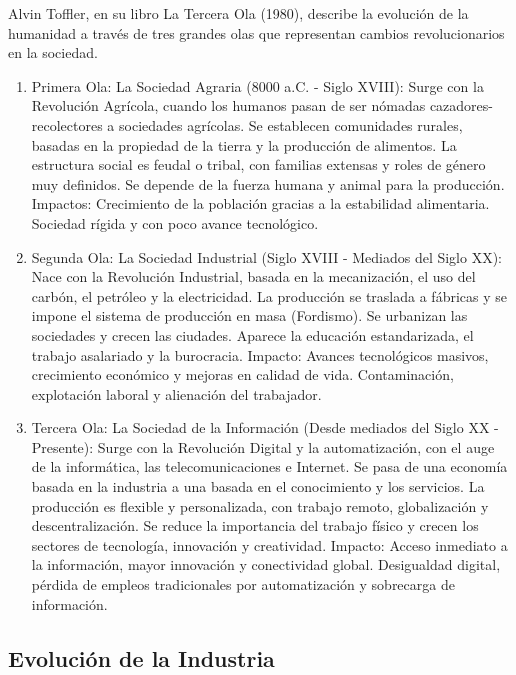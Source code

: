 \documentclass[a4paper,oneside,11pt]{article}
\begin{document}
Alvin Toffler, en su libro La Tercera Ola (1980), describe la evolución de la humanidad a través de tres grandes olas que representan cambios revolucionarios en la sociedad.

\begin{enumerate}
    \item Primera Ola: La Sociedad Agraria (8000 a.C. - Siglo XVIII): Surge con la Revolución Agrícola, cuando los humanos pasan de ser nómadas cazadores-recolectores a sociedades agrícolas. Se establecen comunidades rurales, basadas en la propiedad de la tierra y la producción de alimentos. La estructura social es feudal o tribal, con familias extensas y roles de género muy definidos. Se depende de la fuerza humana y animal para la producción. Impactos: Crecimiento de la población gracias a la estabilidad alimentaria. Sociedad rígida y con poco avance tecnológico.

    \item Segunda Ola: La Sociedad Industrial (Siglo XVIII - Mediados del Siglo XX): Nace con la Revolución Industrial, basada en la mecanización, el uso del carbón, el petróleo y la electricidad. La producción se traslada a fábricas y se impone el sistema de producción en masa (Fordismo). Se urbanizan las sociedades y crecen las ciudades. Aparece la educación estandarizada, el trabajo asalariado y la burocracia. Impacto: Avances tecnológicos masivos, crecimiento económico y mejoras en calidad de vida. Contaminación, explotación laboral y alienación del trabajador.

    \item Tercera Ola: La Sociedad de la Información (Desde mediados del Siglo XX - Presente): Surge con la Revolución Digital y la automatización, con el auge de la informática, las telecomunicaciones e Internet. Se pasa de una economía basada en la industria a una basada en el conocimiento y los servicios. La producción es flexible y personalizada, con trabajo remoto, globalización y descentralización. Se reduce la importancia del trabajo físico y crecen los sectores de tecnología, innovación y creatividad. Impacto: Acceso inmediato a la información, mayor innovación y conectividad global. Desigualdad digital, pérdida de empleos tradicionales por automatización y sobrecarga de información.

\end{enumerate}

\subsection{Evolución de la Industria}
\end{document}
